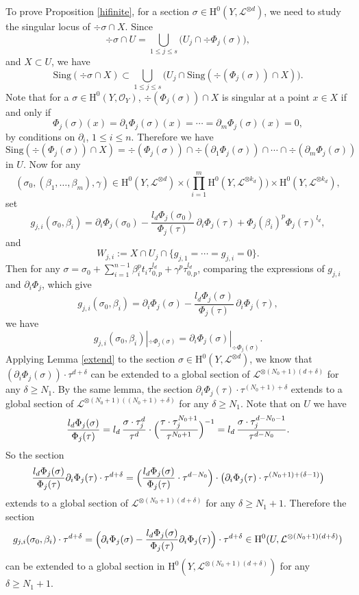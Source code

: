 \documentclass[JEP,XML,SOM,Unicode,published]{cedram}
\theoremstyle{plain}
\theoremstyle{definition}
\newcommand{\ho}{\mathrm{H}}
\newcommand{\li}{\mathcal{L}}
\begin{document}
To prove Proposition \ref{hifinite}, for a section $\sigma\in \ho^0(Y, \mathcal{L}^{\otimes d})$, we need to study the singular locus of $\div \sigma\cap X$. Since
\[
\div \sigma \cap U=\bigcup_{1\leq j\leq s}\bigl(U_j\cap \div \Phi_j(\sigma) \bigr),
\]
and $X\subset U$, we have
\[
\mathrm{Sing}(\div \sigma\cap X)\subset \bigcup_{1\leq j\leq s}\bigl(U_j\cap \mathrm{Sing}(\div (\Phi_j(\sigma))\cap X) \bigr).
\]
Note that for a $\sigma\in \ho^0(Y, \mathcal{O}_Y)$, $\div (\Phi_j(\sigma))\cap X$ is singular at a point $x\in X$ if and only if
\[
\Phi_j(\sigma)(x)=\partial_1\Phi_j(\sigma)(x)=\cdots=\partial_m\Phi_j(\sigma)(x)=0,
\]
by conditions on $\partial_i$, $1\leq i\leq n$. Therefore we have
\[
\mathrm{Sing}(\div (\Phi_j(\sigma))\cap X)=\div (\Phi_j(\sigma))\cap \div (\partial_1\Phi_j(\sigma))\cap\cdots\cap \div (\partial_m\Phi_j(\sigma))
\]
in $U$. Now for any
\[
(\sigma_0, (\beta_1,\dots, \beta_m), \gamma) \in \ho^0(Y,\mathcal{L}^{\otimes d})\times \biggl(\prod_{i=1}^m \ho^0(Y,\mathcal{L}^{\otimes k_d}) \biggr) \times \ho^0(Y, \mathcal{L}^{\otimes k_d}),
\]
set
\[
g_{j,i}(\sigma_0,\beta_i)=\partial_i \Phi_{j}(\sigma_0)-\frac{l_d\Phi_{j}(\sigma_0)}{\Phi_{j}(\tau)}\, \partial_i\Phi_{j}(\tau)+\Phi_{j}(\beta_i)^p\Phi_{j}(\tau)^{l_d},
\]
and
\[
W_{j,i}:=X\cap U_j\cap \{ g_{j,1}=\cdots=g_{j,i}=0 \}.
\]
Then for any $\sigma=\sigma_0+\sum_{i=1}^{n-1} \beta_i^pt_i\tau_{0,p}^{l_d}+\gamma^p\tau_{0,p}^{l_d}$, comparing the expressions of $g_{j,i}$ and $\partial_i\Phi_{j}$, which give
\[
g_{j,i}(\sigma_0,\beta_i)=\partial_i\Phi_{j}(\sigma)-\frac{l_d\Phi_j(\sigma)}{\Phi_j(\tau)}\,\partial_i\Phi_j(\tau),
\]
we have
\[
g_{j,i}(\sigma_0,\beta_i)|_{ \div \Phi_{j}(\sigma)}=\partial_i\Phi_{j}(\sigma)|_{ \div \Phi_{j}(\sigma)}.
\]
Applying Lemma \ref{extend} to the section $\sigma\in \ho^0(Y, \mathcal{L}^{\otimes d})$, we know that $\left(\partial_i \Phi_j(\sigma) \right)\cdot \tau^{d+\delta}$ can be extended to a global section of $\li^{\otimes (N_0+1)(d+\delta)}$ for any $\delta \geq N_1$. By the same lemma, the section $\partial_i\Phi_j(\tau) \cdot \tau^{(N_0+1)+\delta}$ extends to a global section of $\li^{\otimes (N_0+1)((N_0+1)+\delta)}$ for any $\delta \geq N_1$. Note that on $U$ we have
\[
\frac{l_d\Phi_j(\sigma)}{\Phi_j(\tau)}= l_d\,\frac{\sigma \cdot \tau_j^d}{\tau^d} \cdot\Bigl(\frac{\tau \cdot \tau_j^{N_0+1}}{\tau^{N_0+1}}\Bigr)^{-1}=l_d\,\frac{\sigma \cdot \tau_j^{d-N_0-1}}{\tau^{d-N_0}}.
\]
So the section
\[
\frac{l_d\Phi_j(\sigma)}{\Phi_j(\tau)}\partial_i\Phi_j(\tau)\cdot \tau^{d+\delta} = \Bigl(\frac{l_d\Phi_j(\sigma)}{\Phi_j(\tau)}\cdot \tau^{d-N_0}\Bigr)\cdot \bigl(\partial_i\Phi_j(\tau) \cdot \tau^{(N_0+1)+(\delta-1)} \bigr)
\]
extends to a global section of $\li^{\otimes (N_0+1)(d+\delta)}$ for any $\delta \geq N_1+1$.
Therefore the section
\[
g_{j,i}(\sigma_0,\beta_i)\cdot \tau^{d+\delta}=\Bigl(\partial_i\Phi_{j}(\sigma)-\frac{l_d\Phi_j(\sigma)}{\Phi_j(\tau)}\partial_i\Phi_j(\tau)\Bigr)\cdot \tau^{d+\delta}\in \ho^0(U, \li^{\otimes (N_0+1)(d+\delta)})
\]
can be extended to a global section in $\ho^0(Y, \li^{\otimes (N_0+1)(d+\delta)})$ for any $\delta\geq N_1+1$.
\end{document}
